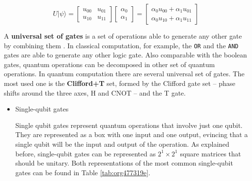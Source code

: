 \begin{itemize}
\begin{equation}
\label{eq:orgaab2854}
U |\psi\rangle=\begin{bmatrix}u_{00}&u_{01}\\u_{10}&u_{11}\end{bmatrix} \begin{bmatrix}\alpha_0 \\ \alpha_1 \end{bmatrix} = \begin{bmatrix}\alpha_0 u_{00} + \alpha_1 u_{01} \\ \alpha_0 u_{10} + \alpha_1 u_{11} \end{bmatrix}
\end{equation}

A \textbf{universal set of gates} is a set of operations able to generate any other gate by combining them \cite{Nielsen_2009}.
In classical computation, for example, the \texttt{OR} and the \texttt{AND} gates are able to generate any other logic gate.
Also comparable with the boolean gates, quantum operations can be decomposed in other set of quantum operations.
In quantum computation there are several universal set of gates.
The most used one is the \textbf{Clifford+T} set, formed by the Clifford gate set -- phase shifts around the three axes, H and CNOT -- and the T gate.

\begin{itemize}
\item Single-qubit gates
\label{sec:org6e9afc8}

Single qubit gates represent quantum operations that involve just one qubit.
They are represented as a box with one input and one output, evincing that a single qubit will be the input and output of the operation.
As explained before, single-qubit gates can be represented as \(2^1 \times 2^1\) square matrices that should be unitary.
Both representations of the most common single-qubit gates can be found in Table \ref{tab:org477319e}.


\end{itemize}
\end{itemize}
